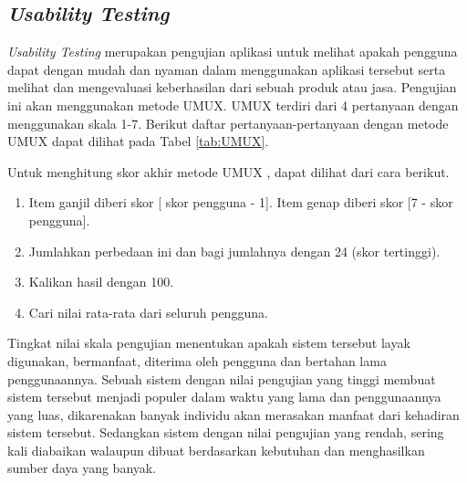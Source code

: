 \subsection{\textit{Usability Testing}}
\textit{Usability Testing} merupakan pengujian aplikasi untuk melihat apakah pengguna dapat dengan mudah dan nyaman dalam menggunakan aplikasi tersebut serta melihat dan mengevaluasi keberhasilan dari sebuah produk atau jasa. Pengujian ini akan menggunakan metode UMUX. UMUX terdiri dari 4 pertanyaan dengan menggunakan skala 1-7. Berikut daftar pertanyaan-pertanyaan dengan metode UMUX dapat dilihat pada Tabel \ref{tab:UMUX}.

\begin{table}[H]
\caption{Daftar Pertanyaan Metode UMUX.}
\label{tab:UMUX}
\end{table}

Untuk menghitung skor akhir metode UMUX \citep{finstad2010usability}, dapat dilihat dari cara berikut.

\begin{enumerate}
\item Item ganjil diberi skor [ skor pengguna - 1]. Item genap diberi skor [7 - skor pengguna].

\item Jumlahkan perbedaan ini dan bagi jumlahnya dengan 24 (skor tertinggi).

\item Kalikan hasil dengan 100.

\item Cari nilai rata-rata dari seluruh pengguna.
\end{enumerate}

\par Tingkat nilai skala pengujian menentukan apakah sistem tersebut layak digunakan, bermanfaat, diterima oleh pengguna dan bertahan lama penggunaannya. Sebuah sistem dengan nilai pengujian yang tinggi membuat sistem tersebut menjadi populer dalam waktu yang lama dan penggunaannya yang luas, dikarenakan banyak individu akan merasakan manfaat dari kehadiran sistem tersebut. Sedangkan sistem dengan nilai pengujian yang rendah, sering kali diabaikan walaupun dibuat berdasarkan kebutuhan dan menghasilkan sumber daya yang banyak.

